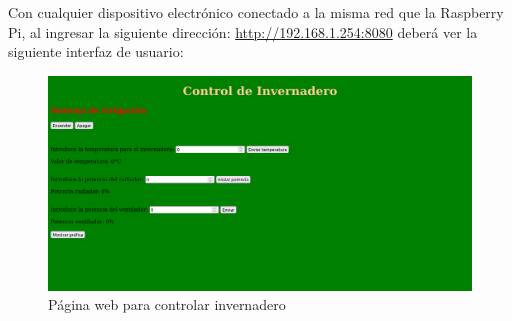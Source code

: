 \documentclass[letterpaper,10.5pt]{article} %
\begin{document}
	Con cualquier dispositivo electrónico conectado a la misma red que la Raspberry Pi, al ingresar la siguiente dirección: \url{http://192.168.1.254:8080} deberá ver la siguiente interfaz de usuario:
	\begin{figure}[H]
		\centering
		\includegraphics[width=\linewidth, keepaspectratio]{img/pagina.png}
		\caption{Página web para controlar invernadero} %
		\label{fig:figura2} %
	\end{figure}	
	
\end{document}
